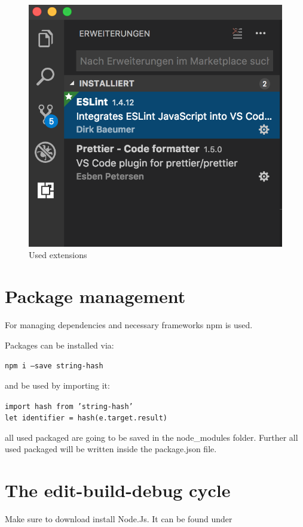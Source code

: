 \begin{figure}[H]
	\centering
	\includegraphics[scale=0.5]{bilder/cyto/LINT.png}
	\caption{Used extensions}
	\label{fig:Extensions}
\end{figure}

\section{Package management}
For managing dependencies and necessary frameworks npm is used. 

Packages can be installed via:

	\texttt{npm i ---save string-hash}

and be used by importing it:

	\texttt{import hash from 'string-hash'} \\
	\texttt{let identifier = hash(e.target.result)}

all used packaged are going to be saved in the node\_modules
folder. Further all used packaged will be written inside the
package.json file.


\section{The edit-build-debug cycle}

Make sure to download install Node.Js. It can be found under

